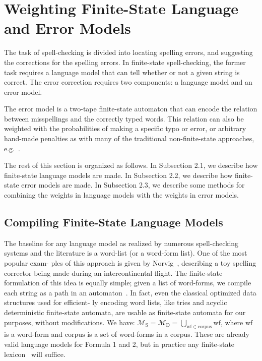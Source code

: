 \documentclass[postprint]{flammie}
\begin{document}
\section{Weighting Finite-State Language and Error Models}

The task of spell-checking is divided into locating spelling errors, and
suggesting the corrections for the spelling errors. In finite-state
spell-checking, the former task requires a language model that can tell
whether or not a given string is correct. The error correction requires two
components: a language model and an error model.

The error model is a two-tape finite-state automaton that can encode the
relation between misspellings and the correctly typed words. This relation can
also be weighted with the probabilities of making a specific typo or error, or
arbitrary hand-made penalties as with many of the traditional non-finite-state
approaches, e.g.~\cite{hunspell}.

The rest of this section is organized as follows. In Subsection 2.1, we
describe how finite-state language models are made. In Subsection 2.2, we
describe how finite-state error models are made. In Subsection 2.3, we describe
some methods for combining the weights in language models with the weights in
error models.


\subsection{Compiling Finite-State Language Models}

The baseline for any language model as realized by numerous spell-checking
systems and the literature is a word-list (or a word-form list). One of the
most popular exam- ples of this approach is given by Norvig~\cite{norvig},
describing a toy spelling corrector being made during an intercontinental
flight. The finite-state formulation of this idea is equally simple; given a
list of word-forms, we compile each string as a path in an
automaton~\cite{pirinen2012effects}. In fact, even the classical optimized data
structures used for efficient- ly encoding word lists, like tries and acyclic
deterministic finite-state automata, are usable as finite-state automata for
our purposes, without modifications. We have:
   $\mathcal{M}_\mathrm{S} = \mathcal{M}_\mathrm{D} = \bigcup_{\mathrm{wf} \in \mathrm{corpus}} \mathrm{wf}$, where $\mathrm{wf}$ is a word-form and $\mathrm{corpus}$ is a
set of word-forms in a corpus. These are already valid language models for
Formula 1 and 2, but in practice any finite-state
lexicon~\cite{beesley2003finite} will suffice.
\end{document}
